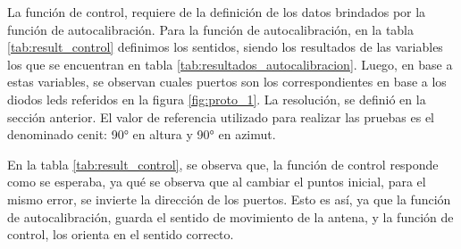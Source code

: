 La función de control, requiere de la definición de los datos brindados por la función de autocalibración. Para la función de autocalibración, en la tabla \ref{tab:result_control} definimos los sentidos, siendo los resultados de las variables los que se encuentran en tabla \ref{tab:resultados_autocalibracion}. Luego, en base a estas variables, se observan cuales puertos son los correspondientes en base a los diodos leds referidos en la figura \ref{fig:proto_1}. La resolución, se definió en la sección anterior. El valor de referencia utilizado para realizar las pruebas es el denominado cenit: 90° en altura y 90° en azimut. 

En la tabla \ref{tab:result_control}, se observa que, la función de control responde como se esperaba, ya qué se observa que al cambiar el puntos inicial, para el mismo error, se invierte la dirección de los puertos. Esto es así, ya que la función de autocalibración, guarda el sentido de movimiento de la antena, y la función de control, los orienta en el sentido correcto.    


